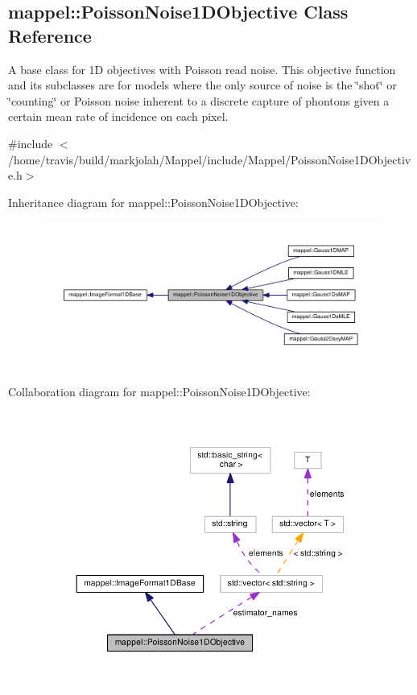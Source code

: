 \hypertarget{classmappel_1_1PoissonNoise1DObjective}{}\subsection{mappel\+:\+:Poisson\+Noise1\+D\+Objective Class Reference}
\label{classmappel_1_1PoissonNoise1DObjective}


A base class for 1D objectives with Poisson read noise. This objective function and its subclasses are for models where the only source of noise is the \char`\"{}shot\char`\"{} or \char`\"{}counting\char`\"{} or Poisson noise inherent to a discrete capture of phontons given a certain mean rate of incidence on each pixel.  




{\ttfamily \#include $<$/home/travis/build/markjolah/\+Mappel/include/\+Mappel/\+Poisson\+Noise1\+D\+Objective.\+h$>$}



Inheritance diagram for mappel\+:\+:Poisson\+Noise1\+D\+Objective\+:\nopagebreak
\begin{figure}[H]
\begin{center}
\leavevmode
\includegraphics[width=350pt]{classmappel_1_1PoissonNoise1DObjective__inherit__graph}
\end{center}
\end{figure}


Collaboration diagram for mappel\+:\+:Poisson\+Noise1\+D\+Objective\+:\nopagebreak
\begin{figure}[H]
\begin{center}
\leavevmode
\includegraphics[width=350pt]{classmappel_1_1PoissonNoise1DObjective__coll__graph}
\end{center}
\end{figure}
